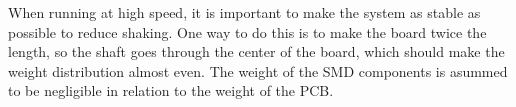 When running at high speed, it is important to make the system as stable as possible to reduce shaking.
One way to do this is to make the board twice the length, so the shaft goes through the center of the board, 
which should make the weight distribution almost even.
The weight of the SMD components is asummed to be negligible in relation to the weight of the PCB.